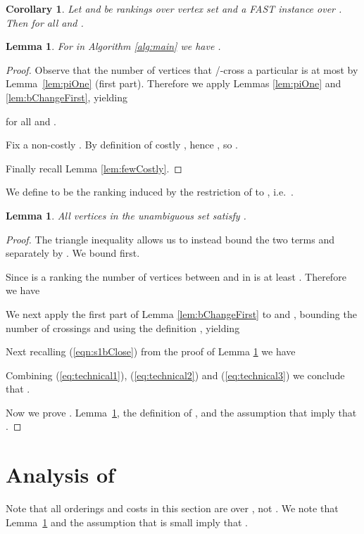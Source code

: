 \documentclass[dvips,11pt,letter]{article}
\newtheorem{corollary}[theorem]{Corollary}
\newtheorem{lemma}[theorem]{Lemma}
\begin{document}
{\begin{corollary} \label{lem:fastSVMlandscape}
Let  and  be rankings over vertex set  and  a FAST instance over . Then  for all  and .
\end{corollary}

\begin{lemma}\label{lem:Usmall}
For  in Algorithm \ref{alg:main} we have
.
\end{lemma}
\begin{proof}
Observe that the number of vertices that /-cross a particular  is at most  by Lemma~\ref{lem:piOne} (first part). Therefore we apply Lemmas \ref{lem:piOne} and \ref{lem:bChangeFirst}, yielding

for all  and .

Fix a non-costly . By definition of costly , hence , so .

Finally recall Lemma \ref{lem:fewCostly}.
\end{proof}

We define  to be the ranking induced by the restriction of  to , i.e.\ .

\begin{lemma}\label{lem:piTwo}
All vertices in the unambiguous set  satisfy . 
\end{lemma}
\begin{proof}
The triangle inequality  allows us to instead bound the two terms  and  separately by . We bound  first.

Since  is a ranking the number of vertices  between  and  in  is at least . Therefore we have


We next apply the first part of Lemma \ref{lem:bChangeFirst} to  and , bounding the number of crossings and  using the definition , yielding


Next recalling (\ref{eqn:s1bClose}) from the proof of Lemma \ref{lem:Usmall} we have


Combining (\ref{eq:technical1}), (\ref{eq:technical2}) and (\ref{eq:technical3}) we conclude that .

Now we prove .
Lemma~\ref{lem:Usmall}, the definition of , and the assumption that  imply that .
\end{proof}

\section{Analysis of } \label{sec:piThree}

Note that all orderings and costs in this section are over , not . We note that  Lemma~\ref{lem:Usmall} and the assumption that  is small imply that .

}
\end{document}
